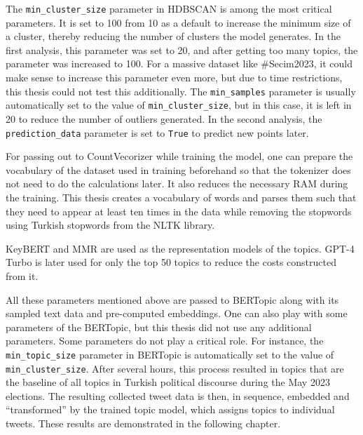 The \texttt{min\_cluster\_size} parameter in HDBSCAN is among the most critical parameters. It is 
set to 100 from 10 as a default to increase the minimum size of a cluster, thereby reducing 
the number of clusters the model generates. In the first analysis, this parameter was set to 
20, and after getting too many topics, the parameter was increased to 100. For a massive 
dataset like \#Secim2023, it could make sense to increase this parameter even more, but due 
to time restrictions, this thesis could not test this additionally. The \texttt{min\_samples} 
parameter is usually automatically set to the value of \texttt{min\_cluster\_size}, but in this 
case, it is left in 20 to reduce the number of outliers generated. In the second analysis, 
the \texttt{prediction\_data} parameter is set to \texttt{True} to predict new points later.

For passing out to CountVecorizer while training the model, one can prepare the vocabulary 
of the dataset used in training beforehand so that the tokenizer does not need to do the 
calculations later. It also reduces the necessary RAM during the training. This thesis 
creates a vocabulary of words and parses them such that they need to appear at least ten 
times in the data while removing the stopwords using Turkish stopwords from the NLTK library. 

KeyBERT and MMR are used as the representation models of the topics. GPT-4 Turbo is later 
used for only the top 50 topics to reduce the costs constructed from it. 

All these parameters mentioned above are passed to BERTopic along with its sampled text 
data and pre-computed embeddings. One can also play with some parameters of the BERTopic, 
but this thesis did not use any additional parameters. Some parameters do not play a 
critical role. For instance, the \texttt{min\_topic\_size} parameter in BERTopic is automatically 
set to the value of \texttt{min\_cluster\_size}. After several hours, this process resulted in 
topics that are the baseline of all topics in Turkish political discourse during the May 
2023 elections. The resulting collected tweet data is then, in sequence, embedded and 
``transformed'' by the trained topic model, which assigns topics to individual tweets. 
These results are demonstrated in the following chapter.

